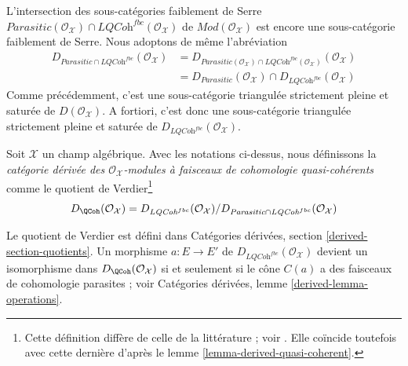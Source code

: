 \medskip\noindent
L'intersection des sous-catégories faiblement de Serre
$\textit{Parasitic}(\mathcal{O}_\mathcal{X}) \cap
\textit{LQCoh}^{fbc}(\mathcal{O}_\mathcal{X})$
de $\textit{Mod}(\mathcal{O}_\mathcal{X})$ est encore une sous-catégorie
faiblement de Serre. Nous adoptons de même l'abréviation
\begin{align*}
D_{\textit{Parasitic} \cap \textit{LQCoh}^{fbc}}(\mathcal{O}_\mathcal{X})
& =
D_{\textit{Parasitic}(\mathcal{O}_\mathcal{X}) \cap
\textit{LQCoh}^{fbc}(\mathcal{O}_\mathcal{X})}(\mathcal{O}_\mathcal{X}) \\
& =
D_{\textit{Parasitic}}(\mathcal{O}_\mathcal{X})
\cap
D_{\textit{LQCoh}^{fbc}}(\mathcal{O}_\mathcal{X})
\end{align*}
Comme précédemment, c'est une sous-catégorie triangulée strictement pleine et
saturée de $D(\mathcal{O}_\mathcal{X})$. A fortiori, c'est donc une
sous-catégorie triangulée strictement pleine et saturée de
$D_{\textit{LQCoh}^{fbc}}(\mathcal{O}_\mathcal{X})$.

\begin{definition}
\label{definition-derived}
Soit $\mathcal{X}$ un champ algébrique. Avec les notations ci-dessus, nous
définissons la {\it catégorie dérivée des $\mathcal{O}_\mathcal{X}$-modules à
faisceaux de cohomologie quasi-cohérents} comme le quotient de
Verdier\footnote{Cette définition diffère de celle de la littérature ; voir
\cite[6.3]{olsson_sheaves}. Elle coïncide toutefois avec cette dernière d'après
le lemme \ref{lemma-derived-quasi-coherent}.}
$$
D_\QCoh(\mathcal{O}_\mathcal{X}) =
D_{\textit{LQCoh}^{fbc}}(\mathcal{O}_\mathcal{X})/
D_{\textit{Parasitic} \cap \textit{LQCoh}^{fbc}}(\mathcal{O}_\mathcal{X})
$$
\end{definition}

\noindent
Le quotient de Verdier est défini dans Catégories dérivées, section
\ref{derived-section-quotients}. Un morphisme $a : E \to E'$ de
$D_{\textit{LQCoh}^{fbc}}(\mathcal{O}_\mathcal{X})$ devient un isomorphisme
dans $D_\QCoh(\mathcal{O}_\mathcal{X})$ si et seulement si le cône $C(a)$ a des
faisceaux de cohomologie parasites ; voir Catégories dérivées, lemme
\ref{derived-lemma-operations}.

